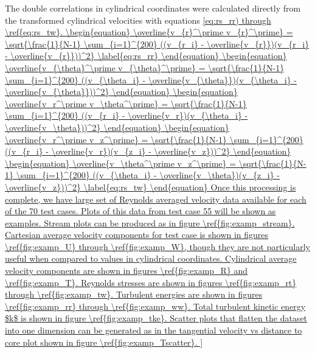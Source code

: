 The double correlations in cylindrical coordinates were calculated directly 
from the transformed cylindrical velocities with equations \ref{eq:rs_rr) 
through \ref{eq:rs_tw}.
	
\begin{equation}
\overline{v_{r}^\prime v_{r}^\prime} = \sqrt{\frac{1}{N-1} \sum_{i=1}^{200} 
	((v_{r_i} - \overline{v_{r}})(v_{r_i} - \overline{v_{r}}))^2}
\label{eq:rs_rr}
\end{equation}

\begin{equation}
\overline{v_{\theta}^\prime v_{\theta}^\prime} = \sqrt{\frac{1}{N-1} 
\sum_{i=1}^{200} 
	((v_{\theta_i} - \overline{v_{\theta}})(v_{\theta_i} - 
	\overline{v_{\theta}}))^2}
\end{equation}

\begin{equation}
\overline{v_r^\prime v_\theta^\prime} = \sqrt{\frac{1}{N-1} \sum_{i=1}^{200} 
	((v_{r_i} - \overline{v_r})(v_{\theta_i} - \overline{v_\theta}))^2}
\end{equation}

\begin{equation}
\overline{v_r^\prime v_z^\prime} = \sqrt{\frac{1}{N-1} \sum_{i=1}^{200} 
	((v_{r_i} - \overline{v_r})(v_{z_i} - \overline{v_z}))^2}
\end{equation}

\begin{equation}
\overline{v_\theta^\prime v_z^\prime} = \sqrt{\frac{1}{N-1} \sum_{i=1}^{200} 
	((v_{\theta_i} - \overline{v_\theta})(v_{z_i} - \overline{v_z}))^2}
\label{eq:rs_tw}
\end{equation}

	
Once this processing is complete, we have large set of Reynolds averaged 
velocity data available for each of the 70 test cases. Plots of this data from 
test case 55 will be shown as examples. Stream plots can be produced as in 
figure \ref{fig:examp_stream}. Cartesian average velocity components for test 
case is shown in figures \ref{fig:examp_U} through \ref{fig:examp_W}, though 
they are not particularly useful when compared to values in cylindrical 
coordinates. 
Cylindrical average velocity components are shown in figures \ref{fig:examp_R} 
and \ref{fig:examp_T}. Reynolds stresses are shown in figures 
\ref{fig:examp_rt} through \ref{fig:examp_tw}. Turbulent energies are shown in 
figures \ref{fig:examp_rr} through \ref{fig:examp_ww}. Total turbulent kinetic 
energy $k$ is shown in figure \ref{fig:examp_tke}. Scatter plots that 
flatten the dataset into one dimension can be generated as in the tangential 
velocity vs distance to core plot shown in figure \ref{fig:examp_Tscatter}. 

}
